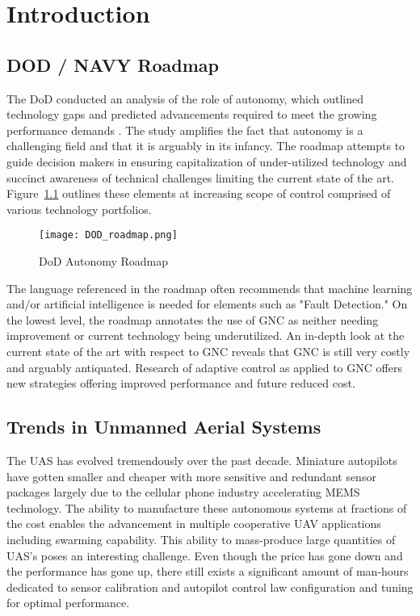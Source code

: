 \chapter{Introduction}\label{ch:intro}
\section{DOD / NAVY Roadmap}
The \ac{DoD} conducted an analysis of the role of autonomy, which outlined technology gaps and predicted advancements required to meet the growing performance demands \cite{dodroadmap}.  The study amplifies the fact that autonomy is a challenging field and that it is arguably in its infancy.  The roadmap attempts to guide decision makers in ensuring capitalization of under-utilized technology and succinct awareness of technical challenges limiting the current state of the art.  Figure~\ref{fig:dod_roadmap} outlines these elements at increasing scope of control comprised of various technology portfolios.  
\begin{figure}[h!]
 \centering
  \texttt{[image: DOD\_roadmap.png]}
  \caption{DoD Autonomy Roadmap \cite{dodroadmap}}
  \label{fig:dod_roadmap}
\end{figure}
The language referenced in the roadmap often recommends that machine learning and/or artificial intelligence is needed for elements such as "Fault Detection."  On the lowest level, the roadmap annotates the use of \ac{GNC} as neither needing improvement or current technology being underutilized.  An in-depth look at the current state of the art with respect to \ac{GNC} reveals that \ac{GNC} is still very costly and arguably antiquated.  Research of adaptive control as applied to \ac{GNC} offers new strategies offering improved performance and future reduced cost.

\section{Trends in Unmanned Aerial Systems}
The \ac{UAS} has evolved tremendously over the past decade.  Miniature autopilots have gotten smaller and cheaper with more sensitive and redundant sensor packages largely due to the cellular phone industry accelerating \ac{MEMS} technology.  The ability to manufacture these autonomous systems at fractions of the cost enables the advancement in multiple cooperative UAV applications including swarming capability.  This ability to mass-produce large quantities of \ac{UAS}'s poses an interesting challenge.  Even though the price has gone down and the performance has gone up, there still exists a significant amount of man-hours dedicated to sensor calibration and autopilot control law configuration and tuning for optimal performance.  


